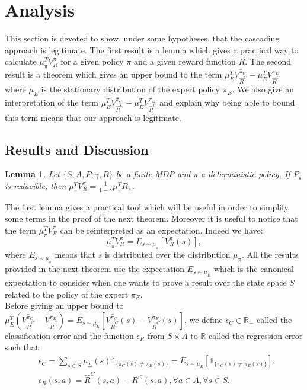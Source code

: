 \documentclass{article} %
\newtheorem{lemma}{Lemma}
\newcommand{\0}{\mathbf{0}}
\newcommand{\1}{\mathbf{1}}
\begin{document}
\section{Analysis} \label{section: Analysis}
This section is devoted to show, under some hypotheses, that the cascading approach is legitimate. The first result is a lemma which gives a practical way to calculate $\mu_\pi^TV^{\pi}_R$ for a given policy $\pi$ and a given reward function $R$. The second result is a theorem which gives an upper bound to the term $\mu_E^TV^{\hat{\pi}_C}_{\hat{R}^C}-\mu_E^TV^{\pi_E}_{\hat{R}^C}$ where $\mu_E$ is the stationary distribution of the expert policy $\pi_E$. We also give an interpretation of the term $\mu_E^TV^{\hat{\pi}_C}_{\hat{R}^C}-\mu_E^TV^{\pi_E}_{\hat{R}^C}$ and explain why being able to bound this term means that our approach is legitimate.
\subsection{Results and Discussion}
\begin{lemma}
\label{lemma: calculs V}
Let $\{S,A,P,\gamma,R\}$ be a finite MDP and $\pi$ a deterministic policy.
If $P_\pi$ is reducible, then $\mu_\pi^TV^\pi_R=\frac{1}{1-\gamma}\mu_\pi^TR_\pi$.
\end{lemma}
The first lemma gives a practical tool which will be useful in order to simplify some terms in the proof of the next theorem. Moreover it is useful
to notice that the term  $\mu_\pi^TV^\pi_R$ can be reinterpreted as an expectation. Indeed we have:
\begin{equation}
\mu_\pi^TV^\pi_R=E_{s \sim \mu_\pi}[V^\pi_R(s)],
\end{equation}
where $E_{s \sim \mu_\pi}$ means that $s$ is distributed over the distribution $\mu_\pi$. All the results provided in the next theorem use the expectation $E_{s \sim \mu_E}$ which is the canonical expectation
to consider when one wants to prove a result over the state space $S$ related to the policy of the expert $\pi_E$.\\
Before giving an upper bound to $\mu_E^T(V^{\hat{\pi}_C}_{\hat{R}^C}-V^{\pi_E}_{\hat{R}^C})=E_{s \sim \mu_E}[V^{\hat{\pi}_C}_{\hat{R}^C}(s)-V^{\pi_E}_{\hat{R}^C}(s)]$, we define $\epsilon_C\in\mathbb{R}_+$ called the classification error and the function $\epsilon_R$ from $S\times A$ to $\mathbb{R}$ called the regression error such that:
\begin{align}
&\epsilon_C=\sum_{s\in S}\mu_{E}(s)\mathds{1}_{\{\pi_C(s)\neq\pi_E(s)\}}=E_{s \sim \mu_E}[\mathds{1}_{\{\pi_C(s)\neq\pi_E(s)\}}],
\\
&\epsilon_R(s,a)=\hat{R}^C(s,a)-R^C(s,a), \forall a\in A, \forall s\in S.
\end{align}
\end{document}
